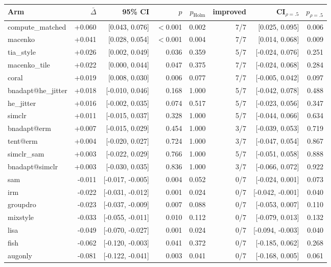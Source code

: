 \begin{tabular}{lrrrrrrr}
\toprule
Arm & $\bar\Delta$ & 95\% CI & $p$ & $p_\text{Holm}$ & improved & CI$_{\rho=.5}$ & $p_{\rho=.5}$ \\
\midrule
compute\_matched & +0.060 & [0.043, 0.076] & $<$0.001 & 0.002 & 7/7 & [0.025, 0.095] & 0.006 \\
macenko & +0.041 & [0.028, 0.054] & $<$0.001 & 0.004 & 7/7 & [0.014, 0.068] & 0.009 \\
tia\_style & +0.026 & [0.002, 0.049] & 0.036 & 0.359 & 5/7 & [-0.024, 0.076] & 0.251 \\
macenko\_tile & +0.022 & [0.000, 0.044] & 0.047 & 0.375 & 7/7 & [-0.024, 0.068] & 0.284 \\
coral & +0.019 & [0.008, 0.030] & 0.006 & 0.077 & 7/7 & [-0.005, 0.042] & 0.097 \\
bnadapt@he\_jitter & +0.018 & [-0.010, 0.046] & 0.168 & 1.000 & 5/7 & [-0.042, 0.078] & 0.488 \\
he\_jitter & +0.016 & [-0.002, 0.035] & 0.074 & 0.517 & 5/7 & [-0.023, 0.056] & 0.347 \\
simclr & +0.011 & [-0.015, 0.037] & 0.328 & 1.000 & 5/7 & [-0.044, 0.066] & 0.634 \\
bnadapt@erm & +0.007 & [-0.015, 0.029] & 0.454 & 1.000 & 3/7 & [-0.039, 0.053] & 0.719 \\
tent@erm & +0.004 & [-0.020, 0.027] & 0.724 & 1.000 & 3/7 & [-0.047, 0.054] & 0.867 \\
simclr\_sam & +0.003 & [-0.022, 0.029] & 0.766 & 1.000 & 5/7 & [-0.051, 0.058] & 0.888 \\
bnadapt@simclr & +0.003 & [-0.030, 0.035] & 0.836 & 1.000 & 3/7 & [-0.066, 0.072] & 0.922 \\
sam & -0.011 & [-0.017, -0.005] & 0.004 & 0.052 & 0/7 & [-0.024, 0.001] & 0.073 \\
irm & -0.022 & [-0.031, -0.012] & 0.001 & 0.024 & 0/7 & [-0.042, -0.001] & 0.040 \\
groupdro & -0.023 & [-0.037, -0.009] & 0.007 & 0.088 & 0/7 & [-0.053, 0.007] & 0.110 \\
mixstyle & -0.033 & [-0.055, -0.011] & 0.010 & 0.112 & 0/7 & [-0.079, 0.013] & 0.132 \\
lisa & -0.049 & [-0.070, -0.027] & 0.001 & 0.024 & 0/7 & [-0.094, -0.003] & 0.040 \\
fish & -0.062 & [-0.120, -0.003] & 0.041 & 0.372 & 0/7 & [-0.185, 0.062] & 0.268 \\
augonly & -0.081 & [-0.122, -0.041] & 0.003 & 0.041 & 0/7 & [-0.168, 0.005] & 0.061 \\
\bottomrule
\end{tabular}
